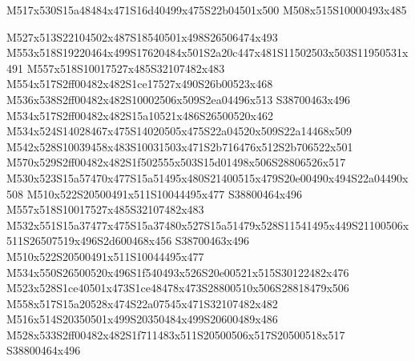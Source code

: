 \documentclass{article}
\begin{document}
\begin{multicols}{2}


\begin{center}
M517x530S15a48484x471S16d40499x475S22b04501x500 M508x515S10000493x485 
\end{center}








M527x513S22104502x487S18540501x498S26506474x493 M553x518S19220464x499S17620484x501S2a20c447x481S11502503x503S11950531x491 M557x518S10017527x485S32107482x483 M554x517S2ff00482x482S1ce17527x490S26b00523x468 M536x538S2ff00482x482S10002506x509S2ea04496x513 S38700463x496 M534x517S2ff00482x482S15a10521x486S26500520x462 M534x524S14028467x475S14020505x475S22a04520x509S22a14468x509 M542x528S10039458x483S10031503x471S2b716476x512S2b706522x501 M570x529S2ff00482x482S1f502555x503S15d01498x506S28806526x517 M530x523S15a57470x477S15a51495x480S21400515x479S20e00490x494S22a04490x508 M510x522S20500491x511S10044495x477 S38800464x496 M557x518S10017527x485S32107482x483 M532x551S15a37477x475S15a37480x527S15a51479x528S11541495x449S21100506x511S26507519x496S2d600468x456 S38700463x496 M510x522S20500491x511S10044495x477 M534x550S26500520x496S1f540493x526S20e00521x515S30122482x476 M523x528S1ce40501x473S1ce48478x473S28800510x506S28818479x506 M558x517S15a20528x474S22a07545x471S32107482x482 M516x514S20350501x499S20350484x499S20600489x486 M528x533S2ff00482x482S1f711483x511S20500506x517S20500518x517 S38800464x496


\end{multicols}
\end{document}
